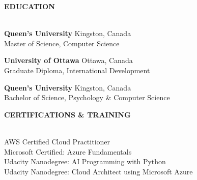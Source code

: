 \documentclass[letterpaper]{article}
\newcommand{\lineunder} {
        \vspace*{-8pt} \\
        \hspace*{-18pt} \hrulefill \\
    }
\newcommand{\header} [1] {
        \vspace{9pt}
        {\hspace*{-18pt}\vspace*{6pt} \large \textbf {#1}}
        \vspace*{-6pt} \lineunder
        \vspace{2pt}
    }
\newcommand{\university}[3]{
        \textbf{#1}  %
        \hfill #2\\  %
        #3\\         %
        \vspace{2mm}
    }
\begin{document}
\vspace{-1.3pt} %

\header{EDUCATION}
    \university
        {Queen's University}
        {Kingston, Canada}
        {Master of Science, Computer Science}
    \university
        {University of Ottawa}
        {Ottawa, Canada}
        {Graduate Diploma, International Development}
    \university
        {Queen's University}
        {Kingston, Canada}
        {Bachelor of Science, Psychology \& Computer Science}


\header{CERTIFICATIONS \& TRAINING}
    AWS Certified Cloud Practitioner\\
    Microsoft Certified: Azure Fundamentals\\
    Udacity Nanodegree: AI Programming with Python\\
    Udacity Nanodegree: Cloud Architect using Microsoft Azure
\end{document}
